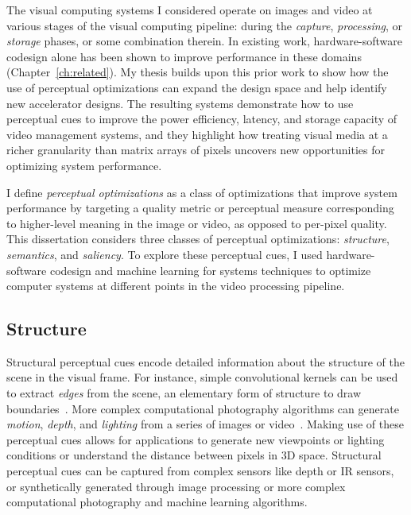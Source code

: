 The visual computing systems I considered operate on images and video at various stages of the visual computing pipeline: during the \emph{capture}, \emph{processing}, or \emph{storage} phases, or some combination therein.
In existing work, hardware-software codesign alone has been shown to improve performance in these domains (Chapter~\ref{ch:related}).
My thesis builds upon this prior work to show how the use of perceptual optimizations can expand the design space and help identify new accelerator designs.
The resulting systems demonstrate how to use perceptual cues to improve the power efficiency, latency, and storage capacity of video management systems, and they highlight how treating visual media at a richer granularity than matrix arrays of pixels uncovers new opportunities for optimizing system performance.

I define \textit{perceptual optimizations} as a class of optimizations that improve system performance by targeting a quality metric or perceptual measure corresponding to higher-level meaning in the image or video, as opposed to per-pixel quality.
This dissertation considers three classes of perceptual optimizations: \textit{structure}, \textit{semantics}, and \textit{saliency}.
To explore these perceptual cues, I used hardware-software codesign and machine learning for systems techniques to optimize computer systems at different points in the video processing pipeline.

\subsection{Structure}
Structural perceptual cues encode detailed information about the structure of the  scene in the visual frame.
For instance, simple convolutional kernels can be used to extract \emph{edges} from the scene, an elementary form of structure to draw boundaries~\cite{FFLS2008}.
More complex computational photography algorithms can generate \emph{motion}, \emph{depth}, and \emph{lighting} from a series of images or video~\cite{optical-flow, googlejump, Barron2015A}.
Making use of these perceptual cues allows for applications to generate new viewpoints or lighting conditions or understand the distance between pixels in 3D space.
Structural perceptual cues can be captured from complex sensors like depth or IR sensors, or synthetically generated through image processing or more complex computational photography and machine learning algorithms.

